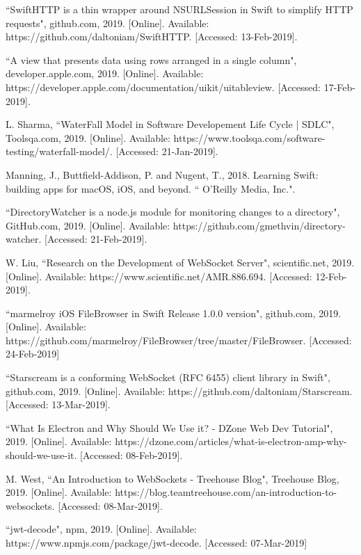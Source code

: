 \documentclass{article}
\begin{document}
\begin{thebibliography}{99}

 ``SwiftHTTP is a thin wrapper around NSURLSession in Swift to simplify HTTP requests", github.com, 2019. [Online]. Available: https://github.com/daltoniam/SwiftHTTP. [Accessed: 13-Feb-2019].

 ``A view that presents data using rows arranged in a single column", developer.apple.com, 2019. [Online]. Available: https://developer.apple.com/documentation/uikit/uitableview. [Accessed: 17-Feb-2019].

 L. Sharma, ``WaterFall Model in Software Developement Life Cycle | SDLC", Toolsqa.com, 2019. [Online]. Available: https://www.toolsqa.com/software-testing/waterfall-model/. [Accessed: 21-Jan-2019].

 Manning, J., Buttfield-Addison, P. and Nugent, T., 2018. Learning Swift: building apps for macOS, iOS, and beyond. `` O'Reilly Media, Inc.".

 ``DirectoryWatcher is a node.js module for monitoring changes to a directory", GitHub.com, 2019. [Online]. Available: https://github.com/gmethvin/directory-watcher. [Accessed: 21-Feb-2019].

 W. Liu, ``Research on the Development of WebSocket Server", scientific.net, 2019. [Online]. Available: https://www.scientific.net/AMR.886.694. [Accessed: 12-Feb-2019].

 ``marmelroy iOS FileBrowser in Swift Release 1.0.0 version", github.com, 2019. [Online]. Available: https://github.com/marmelroy/FileBrowser/tree/master/FileBrowser. [Accessed: 24-Feb-2019]

 ``Starscream is a conforming WebSocket (RFC 6455) client library in Swift", github.com, 2019. [Online]. Available: https://github.com/daltoniam/Starscream. [Accessed: 13-Mar-2019].

 ``What Is Electron and Why Should We Use it? - DZone Web Dev Tutorial", 2019. [Online]. Available: https://dzone.com/articles/what-is-electron-amp-why-should-we-use-it. [Accessed: 08-Feb-2019].

 M. West, ``An Introduction to WebSockets - Treehouse Blog", Treehouse Blog, 2019. [Online]. Available: https://blog.teamtreehouse.com/an-introduction-to-websockets. [Accessed: 08-Mar-2019].

 ``jwt-decode", npm, 2019. [Online]. Available: https://www.npmjs.com/package/jwt-decode. [Accessed: 07-Mar-2019] 


\end{thebibliography}
\end{document}
